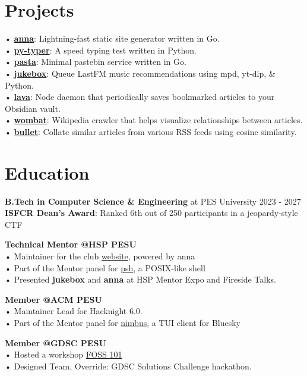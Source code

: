 \documentclass[a4,12pt]{article}
\begin{document}
\section{Projects}
• \textbf{\href{https://github.com/anna-ssg/anna}{anna}}: Lightning-fast static site generator written in Go. \\
• \textbf{\href{https://github.com/polarhive/py-typer}{py-typer}}: A speed typing test written in Python. \\
• \textbf{\href{https://polarhive.net/pasta}{pasta}}: Minimal pastebin service written in Go. \\
• \textbf{\href{https://github.com/polarhive/jukebox}{jukebox}}: Queue LastFM music recommendations using mpd, yt-dlp, \& Python. \\
• \textbf{\href{https://polarhive.net/lava}{lava}}: Node daemon that periodically saves bookmarked articles to your Obsidian vault. \\
• \textbf{\href{https://github.com/polarhive/wombat}{wombat}}: Wikipedia crawler that helps visualize relationships between articles. \\
• \textbf{\href{https://polarhive.net/bullet}{bullet}}: Collate similar articles from various RSS feeds using cosine similarity.


\section{Education}
\textbf{B.Tech in Computer Science \& Engineering} at PES University \hfill 2023 - 2027 \\
\textbf{ISFCR Dean's Award}: Ranked 6th out of 250 participants in a jeopardy-style CTF

\textbf{Technical Mentor @HSP PESU} \\
• Maintainer for the club \href{https://tiramisu-hsp.netlify.app}{website}, powered by anna \\
• Part of the Mentor panel for \href{https://github.com/homebrew-ec-foss/psh}{psh}, a POSIX-like shell \\
• Presented \textbf{jukebox} and \textbf{anna} at HSP Mentor Expo and Fireside Talks.

\textbf{Member @ACM PESU} \\
• Maintainer Lead for Hacknight 6.0. \\
• Part of the Mentor panel for \href{https://github.com/polarhive/nimbus}{nimbus}, a TUI client for Bluesky

\textbf{Member @GDSC PESU} \\
• Hosted a workshop \href{https://polarhive.net/talks/gdsc-foss-101/}{FOSS 101} \\
• Designed Team, Override: GDSC Solutions Challenge hackathon.
\end{document}
